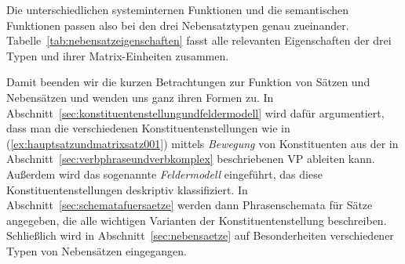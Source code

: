 Die unterschiedlichen systeminternen Funktionen und die semantischen Funktionen passen also bei den drei Nebensatztypen genau zueinander.
Tabelle~\ref{tab:nebensatzeigenschaften} fasst alle relevanten Eigenschaften der drei Typen und ihrer Matrix-Einheiten zusammen.

\begin{table}
  \centering
  \caption{Eigenschaften der drei Typen von Nebensätzen und ihrer jeweiligen Matrix; zur syntaktischen Kategorie RS siehe Abschnitt~\ref{sec:relativsaetze}}
  \label{tab:nebensatzeigenschaften}
\end{table}

Damit beenden wir die kurzen Betrachtungen zur Funktion von Sätzen und Nebensätzen und wenden uns ganz ihren Formen zu.
In Abschnitt~\ref{sec:konstituentenstellungundfeldermodell} wird dafür argumentiert, dass man die verschiedenen Konstituentenstellungen wie in (\ref{ex:hauptsatzundmatrixsatz001}) mittels \textit{Bewegung} von Konstituenten aus der in Abschnitt~\ref{sec:verbphraseundverbkomplex} beschriebenen VP ableiten kann.
Außerdem wird das sogenannte \textit{Feldermodell} eingeführt, das diese Konstituentenstellungen deskriptiv klassifiziert.
In Abschnitt~\ref{sec:schematafuersaetze} werden dann Phrasenschemata für Sätze angegeben, die alle wichtigen Varianten der Konstituentenstellung beschreiben.
Schließlich wird in Abschnitt~\ref{sec:nebensaetze} auf Besonderheiten verschiedener Typen von Nebensätzen eingegangen.


